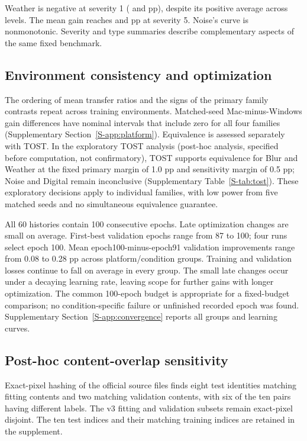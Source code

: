 \documentclass[twoside,a4paper,11pt]{article}
\newcommand{\posthoc}{post-hoc analysis, specified before computation, not confirmatory}
\begin{document}
Weather is negative at severity 1 (\DSevWeatherMacOne{} and \DSevWeatherWinOne{} pp), despite its positive average across levels. The mean gain reaches \DSevWeatherMacFive{} and \DSevWeatherWinFive{} pp at severity 5. Noise's curve is nonmonotonic. Severity and type summaries describe complementary aspects of the same fixed benchmark.

\subsection{Environment consistency and optimization}
\label{sec:convergence}
The ordering of mean transfer ratios and the signs of the primary family contrasts repeat across training environments. Matched-seed Mac-minus-Windows gain differences have nominal intervals that include zero for all four families (Supplementary Section~\ref{S-app:platform}). Equivalence is assessed separately with TOST. In the exploratory TOST analysis (\posthoc), TOST supports equivalence for Blur and Weather at the fixed primary margin of 1.0 pp and sensitivity margin of 0.5 pp; Noise and Digital remain inconclusive (Supplementary Table~\ref{S-tab:tost}). These exploratory decisions apply to individual families, with low power from five matched seeds and no simultaneous equivalence guarantee.

All 60 histories contain 100 consecutive epochs. Late optimization changes are small on average. First-best validation epochs range from 87 to 100; four runs select epoch 100. Mean epoch100-minus-epoch91 validation improvements range from 0.08 to 0.28 pp across platform/condition groups. Training and validation losses continue to fall on average in every group. The small late changes occur under a decaying learning rate, leaving scope for further gains with longer optimization. The common 100-epoch budget is appropriate for a fixed-budget comparison; no condition-specific failure or unfinished recorded epoch was found. Supplementary Section~\ref{S-app:convergence} reports all groups and learning curves.

\subsection{Post-hoc content-overlap sensitivity}
\label{sec:overlap}
Exact-pixel hashing of the official source files finds eight test identities matching fitting contents and two matching validation contents, with six of the ten pairs having different labels. The v3 fitting and validation subsets remain exact-pixel disjoint. The ten test indices and their matching training indices are retained in the supplement.
\end{document}
